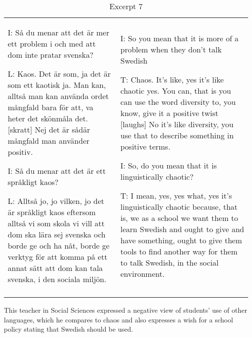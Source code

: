 \documentclass[output=paper]{langscibook}
\begin{document}
\begin{table}
\caption{Excerpt 7}
\label{tab:rosen:excerpt7}
\begin{tabularx}{\textwidth}{XX}

\lsptoprule
I: Så du menar att det är mer ett problem i och med att dom inte pratar svenska?

L: Kaos. Det är som, ja det är som ett kaotisk ja. Man kan, alltså man kan använda ordet mångfald bara för att, va heter det skönmåla det. [skratt] Nej det är sådär mångfald man använder positiv.

I: Så du menar att det är ett språkligt kaos?

L: Alltså jo, jo vilken, jo det är språkligt kaos eftersom alltså vi som skola vi vill att dom ska lära sej svenska och borde ge och ha nåt, borde ge verktyg för att komma på ett annat sätt att dom kan tala svenska, i den sociala miljön. & I: So you mean that it is more of a problem when they don’t talk Swedish

T: Chaos. It’s like, yes it’s like  chaotic yes. You can, that is you can use the word diversity to, you know, give it a positive twist [laughs] No it’s like diversity, you use that to describe something in positive terms.

I: So, do you mean that it is linguistically chaotic?

T: I mean, yes, yes what, yes it’s linguistically chaotic because, that is, we as a school we want them to learn Swedish and ought to give and have something, ought to give them tools to find another way for them to talk Swedish, in the social environment. \\
\lspbottomrule
\end{tabularx}
\end{table}



This teacher in Social Sciences expressed a negative view of students’ use of other languages, which he compares to chaos and also expresses a wish for a school policy stating that Swedish should be used.
\end{document}
